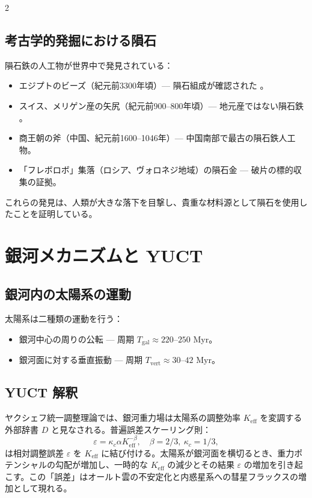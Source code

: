 \documentclass[12pt,a4paper]{article}
\begin{document}
\begin{multicols}{2}
		\subsection{考古学的発掘における隕石}
		隕石鉄の人工物が世界中で発見されている：
		\begin{itemize}
			\item エジプトのビーズ（紀元前3300年頃）— 隕石組成が確認された \cite{Rehren2013}。
			\item スイス、メリゲン産の矢尻（紀元前900–800年頃）— 地元産ではない隕石鉄 \cite{Hofmann2023}。
			\item 商王朝の斧（中国、紀元前1600–1046年）— 中国南部で最古の隕石鉄人工物。
			\item 「フレボロボ」集落（ロシア、ヴォロネジ地域）の隕石金 — 破片の標的収集の証拠。
		\end{itemize}
		これらの発見は、人類が大きな落下を目撃し、貴重な材料源として隕石を使用したことを証明している。
		
		\section{銀河メカニズムと YUCT}
		\subsection{銀河内の太陽系の運動}
		太陽系は二種類の運動を行う：
		\begin{itemize}
			\item 銀河中心の周りの公転 — 周期 \(T_{\text{gal}} \approx 220\)–\(250\) Myr。
			\item 銀河面に対する垂直振動 — 周期 \(T_{\text{vert}} \approx 30\)–\(42\) Myr。
		\end{itemize}
		
		\subsection{YUCT 解釈}
		ヤクシェフ統一調整理論では、銀河重力場は太陽系の調整効率 \(K_{\mathrm{eff}}\) を変調する外部辞書 \(D\) と見なされる。普遍誤差スケーリング則：
		\[
		\varepsilon = \kappa_c \alpha K_{\mathrm{eff}}^{-\beta},\quad \beta = 2/3,\ \kappa_c = 1/3,
		\]
		は相対調整誤差 \(\varepsilon\) を \(K_{\mathrm{eff}}\) に結び付ける。太陽系が銀河面を横切るとき、重力ポテンシャルの勾配が増加し、一時的な \(K_{\mathrm{eff}}\) の減少とその結果 \(\varepsilon\) の増加を引き起こす。この「誤差」はオールト雲の不安定化と内惑星系への彗星フラックスの増加として現れる。
		

\end{multicols}
\end{document}
